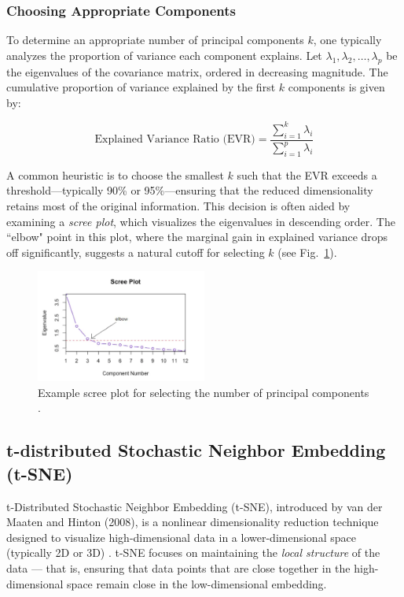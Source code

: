 \documentclass[conference]{IEEEtran}
\begin{document}
\subsubsection{Choosing Appropriate Components}
To determine an appropriate number of principal components \( k \), one typically analyzes the proportion of variance each component explains. Let \( \lambda_1, \lambda_2, \dots, \lambda_p \) be the eigenvalues of the covariance matrix, ordered in decreasing magnitude. The cumulative proportion of variance explained by the first \( k \) components is given by:

\[
\text{Explained Variance Ratio (EVR)} = \frac{\sum_{i=1}^{k} \lambda_i}{\sum_{i=1}^{p} \lambda_i}
\]

A common heuristic is to choose the smallest \( k \) such that the EVR exceeds a threshold—typically 90\% or 95\%—ensuring that the reduced dimensionality retains most of the original information. This decision is often aided by examining a \textit{scree plot}, which visualizes the eigenvalues in descending order. The ``elbow" point in this plot, where the marginal gain in explained variance drops off significantly, suggests a natural cutoff for selecting \( k \) (see Fig.~\ref{fig:scree}).

\begin{figure}[h]
\centering
\includegraphics[width=0.5\textwidth]{scree_plot.png}
\caption{Example scree plot for selecting the number of principal components \cite{screeplot}.}
\label{fig:scree}
\end{figure}
\subsection{t-distributed Stochastic Neighbor Embedding (t-SNE)}
t-Distributed Stochastic Neighbor Embedding (t-SNE), introduced by van der Maaten and Hinton (2008), is a nonlinear dimensionality reduction technique designed to visualize high-dimensional data in a lower-dimensional space (typically 2D or 3D) \cite{tsne}. t-SNE focuses on maintaining the \emph{local structure} of the data — that is, ensuring that data points that are close together in the high-dimensional space remain close in the low-dimensional embedding. \\
\end{document}

